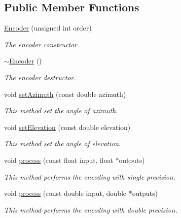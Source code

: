 \subsection*{Public Member Functions}
\begin{DoxyCompactItemize}
\item 
\hyperlink{class_hoa3_d_1_1_encoder_a71052bcb0cbcf600852423c8cbbf29ce}{Encoder} (unsigned int order)
\begin{DoxyCompactList}\small\item\em The encoder constructor. \end{DoxyCompactList}\item 
\hyperlink{class_hoa3_d_1_1_encoder_a9842ee9f5abcba58a05a98dbfdff1b15}{$\sim$\-Encoder} ()
\begin{DoxyCompactList}\small\item\em The encoder destructor. \end{DoxyCompactList}\item 
void \hyperlink{class_hoa3_d_1_1_encoder_a7dbf4d5791003ed486fc0b5462409e0a}{set\-Azimuth} (const double azimuth)
\begin{DoxyCompactList}\small\item\em This method set the angle of azimuth. \end{DoxyCompactList}\item 
void \hyperlink{class_hoa3_d_1_1_encoder_a3bf01c6ecd90108c66c19ce7e5bde97d}{set\-Elevation} (const double elevation)
\begin{DoxyCompactList}\small\item\em This method set the angle of elevation. \end{DoxyCompactList}\item 
void \hyperlink{class_hoa3_d_1_1_encoder_aedcd6cc5a50c85f373c61137e452a9b4}{process} (const float input, float $\ast$outputs)
\begin{DoxyCompactList}\small\item\em This method performs the encoding with single precision. \end{DoxyCompactList}\item 
void \hyperlink{class_hoa3_d_1_1_encoder_a6a8a7c7219424dd74bb5180a5b2c25e3}{process} (const double input, double $\ast$outputs)
\begin{DoxyCompactList}\small\item\em This method performs the encoding with double precision. \end{DoxyCompactList}\end{DoxyCompactItemize}


